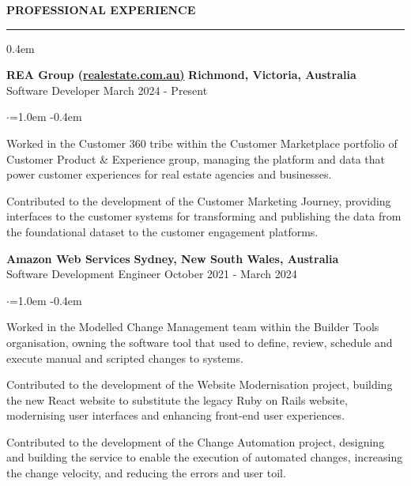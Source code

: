 \documentclass{cv}
\begin{document}
\sectionskip
{} \textbf{PROFESSIONAL EXPERIENCE}
\sectionlineskip
\hrule
\begin{list}{}{\setlength{\leftmargin}{0em}}
\itemsep 0.4em
\item[] 
    \textbf{REA Group (\href{https://realestate.com.au/}{realestate.com.au)}} \hfill \textbf{Richmond, Victoria, Australia}%
    \\
    {Software Developer} \hfill {March 2024 - Present}%
    \begin{list}{$\cdot$}{\leftmargin=1.0em}
    \itemsep -0.4em \vspace{-0.4em}
        \item Worked in the Customer 360 tribe within the Customer Marketplace portfolio of Customer Product \& Experience group, managing the platform and data that power customer experiences for real estate agencies and businesses.
        \item Contributed to the development of the Customer Marketing Journey, providing interfaces to the customer systems for transforming and publishing the data from the foundational dataset to the customer engagement platforms.
    \end{list}
\item[] 
    \textbf{Amazon Web Services} \hfill \textbf{Sydney, New South Wales, Australia}%
    \\ 
    {Software Development Engineer} \hfill {October 2021 - March 2024}%
    \begin{list}{$\cdot$}{\leftmargin=1.0em}
    \itemsep -0.4em \vspace{-0.4em}
        \item Worked in the Modelled Change Management team within the Builder Tools organisation, owning the software tool that used to define, review, schedule and execute manual and scripted changes to systems.
        \item Contributed to the development of the Website Modernisation project, building the new React website to substitute the legacy Ruby on Rails website, modernising user interfaces and enhancing front-end user experiences.
        \item Contributed to the development of the Change Automation project, designing and building the service to enable the execution of automated changes, increasing the change velocity, and reducing the errors and user toil.

\end{list}
\end{list}
\end{document}
